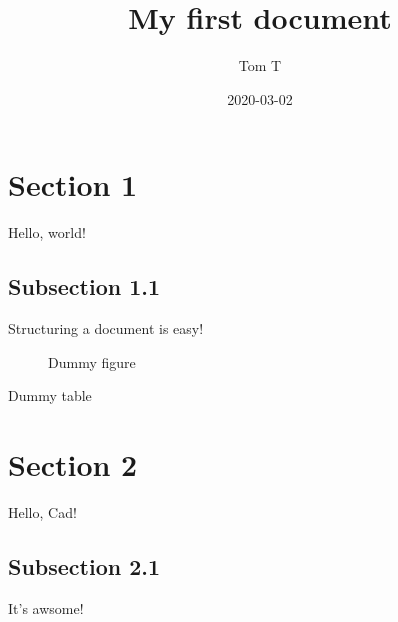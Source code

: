 \documentclass{article}
\title{My first document}
\date{2020-03-02}
\author{Tom T}
\begin{document}
    \maketitle

    \newpage
    \tableofcontents

    \newpage
    \begin{appendix}
        \listoffigures
        \listoftables
    \end{appendix}
    

    \newpage

    \section{Section 1}
    Hello, world!

    \subsection{Subsection 1.1}
    Structuring a document is easy!

    \begin{figure}
        \caption{Dummy figure}
    \end{figure}

    \begin{table}
        \caption{Dummy table}
    \end{table}

    \section{Section 2}
    Hello, Cad!

    \subsection{Subsection 2.1}
    It's awsome!

    
\end{document}
